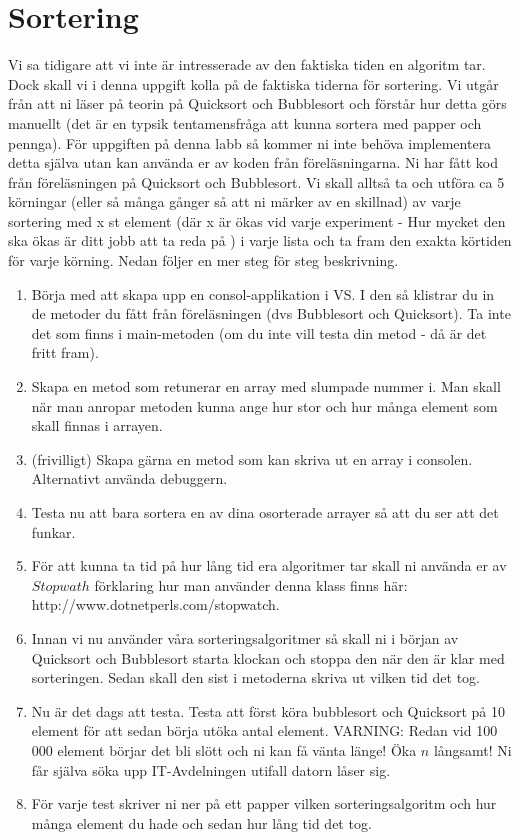 \documentclass{article}
\begin{document}
   
\section*{Sortering}
Vi sa tidigare att vi inte är intresserade av den faktiska tiden en algoritm tar. Dock skall vi i denna uppgift kolla på de faktiska tiderna för sortering. Vi utgår från att ni läser på teorin på Quicksort och Bubblesort och förstår hur detta görs manuellt (det är en typsik tentamensfråga att kunna sortera med papper och pennga). För uppgiften på denna labb så kommer ni inte behöva implementera detta själva utan kan använda er av koden från föreläsningarna. Ni har fått kod från föreläsningen på Quicksort och Bubblesort. Vi skall alltså ta och utföra ca 5 körningar (eller så många gånger så att ni märker av en skillnad) av varje sortering med x st element (där x är ökas vid varje experiment - Hur mycket den ska ökas är ditt jobb att ta reda på ) i varje lista och ta fram den exakta körtiden för varje körning. Nedan följer en mer steg för steg beskrivning.

\begin{enumerate}
\item Börja med att skapa upp en consol-applikation i VS. I den så klistrar du in de metoder du fått från föreläsningen (dvs Bubblesort och Quicksort). Ta inte det som finns i main-metoden (om du inte vill testa din metod - då är det fritt fram).
\item Skapa en metod som retunerar en array med slumpade nummer i. Man skall när man anropar metoden kunna ange hur stor och hur många element som skall finnas i arrayen. 
\item (frivilligt) Skapa gärna en metod som kan skriva ut en array i consolen. Alternativt använda debuggern.
\item  Testa nu att bara sortera en av dina osorterade arrayer så att du ser att det funkar.
\item För att kunna ta tid på hur lång tid era algoritmer tar skall ni använda er av $Stopwath$ förklaring hur man använder denna klass finns här: http://www.dotnetperls.com/stopwatch.
\item Innan vi nu använder våra sorteringsalgoritmer så skall ni i början av Quicksort och Bubblesort starta klockan och stoppa den när den är klar med sorteringen. Sedan skall den sist i metoderna skriva ut vilken tid det tog.
\item Nu är det dags att testa. Testa att först köra bubblesort och Quicksort på 10 element för att sedan börja utöka antal element. VARNING: Redan vid 100 000 element börjar det bli slött och ni kan få vänta länge! Öka $n$ långsamt! Ni får själva söka upp IT-Avdelningen utifall datorn låser sig.
\item För varje test skriver ni ner på ett papper vilken sorteringsalgoritm och hur många element du hade och sedan hur lång tid det tog.
\end{enumerate}
\end{document}
